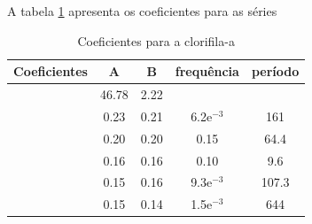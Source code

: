 \documentclass[12pt,a4paper,portuguese]{article}
\begin{document}
A tabela \ref{Coeficientes para a clorifila-a } apresenta os coeficientes para as séries
\begin{table}[H]

\centering
\begin{tabular}{|c|c|c|c|c|}
	\hline
	Coeficientes & A & B & frequência & período \\
	\hline
	& 46.78 & 2.22 &  &  \\
	\hline
	&  0.23 & 0.21 &  6.2e$^{-3}$ & 161 \\
	\hline
	& 0.20 & 0.20 & 0.15 & 64.4   \\
	\hline
	& 0.16 & 0.16 & 0.10 & 9.6 \\
	\hline
	& 0.15 & 0.16 & 9.3e$^{-3}$ & 107.3 \\
	\hline
	& 0.15 & 0.14 & 1.5e$^{-3}$ & 644 \\
	\hline
\end{tabular}
\caption{Coeficientes para a clorifila-a}
\label{Coeficientes para a clorifila-a }
\end{table}
\end{document}
